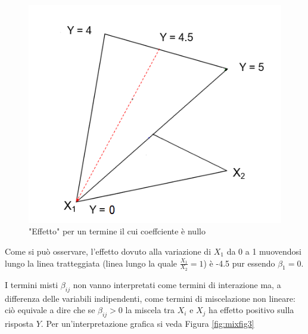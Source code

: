 \documentclass[
  11pt,
]{book}
\begin{document}
\begin{figure}[ht]

{\centering \includegraphics[width=1\linewidth]{Immagini/Mixt/01_coeff_effetto} 

}

\caption{"Effetto" per un termine il cui coeffciente è nullo}\label{fig:mixfig1}
\end{figure}

Come si può osservare, l'effetto dovuto alla variazione di \(X_1\) da 0 a 1 muovendosi lungo la linea tratteggiata (linea lungo la quale \(\frac{X_1}{X_2}=1\)) è -4.5 pur essendo \(\beta_1=0\).

I termini misti \(\beta_{ij}\) non vanno interpretati come termini di interazione ma, a differenza delle variabili indipendenti, come termini di miscelazione non lineare: ciò equivale a dire che se \(\beta_{ij}>0\) la miscela tra \(X_i\) e \(X_j\) ha effetto positivo sulla risposta \(Y\). Per un'interpretazione grafica si veda Figura \ref{fig:mixfig3}
\end{document}
